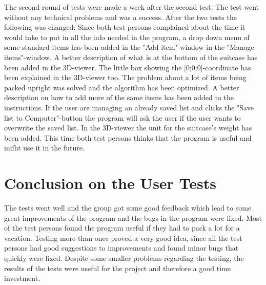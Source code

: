 The second round of tests were made a week after the second test. The test went without any technical problems and was a success. After the two tests the following was changed: Since both test persons complained about the time it would take to put in all the info needed in the program, a drop down menu of some standard items has been added in the "Add item"-window in the "Manage items"-window. A better description of what is at the bottom of the suitcase has been added in the 3D-viewer. The little box showing the [0;0;0]-coordinate has been explained in the 3D-viewer too. The problem about a lot of items being packed upright was solved and the algorithm has been optimized. A better description on how to add more of the same items has been added to the instructions. If the user are managing an already saved list and clicks the "Save list to Computer"-button the program will ask the user if the user wants to overwrite the saved list. In the 3D-viewer the unit for the suitcase's weight has been added. This time both test persons thinks that the program is useful and mifht use it in the future.

\section{Conclusion on the User Tests}
The tests went well and the group got some good feedback which lead to some great improvements of the program and the bugs in the program were fixed. Most of the test persons found the program useful if they had to pack a lot for a vacation. Testing more than once proved a very good idea, since all the test persons had good suggestions to improvements and found minor bugs that quickly were fixed. Despite some smaller problems regarding the testing, the results of the tests were useful for the project and therefore a good time investment.